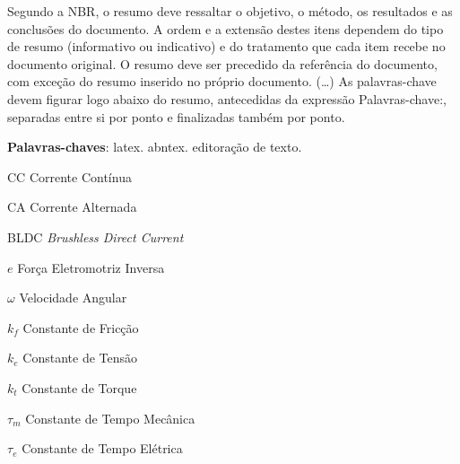 \documentclass[
	12pt,				%
	openright,			%
	oneside,			%
	a4paper,			%
	english,			%
	french,				%
	spanish,			%
	brazil,				%
	]{abntex2}
\begin{document}

\frenchspacing 


\imprimircapa

\imprimirfolhaderosto*



\setlength{\absparsep}{18pt} %
\begin{resumo}
 Segundo a NBR, o resumo deve ressaltar o
 objetivo, o método, os resultados e as conclusões do documento. A ordem e a extensão
 destes itens dependem do tipo de resumo (informativo ou indicativo) e do
 tratamento que cada item recebe no documento original. O resumo deve ser
 precedido da referência do documento, com exceção do resumo inserido no
 próprio documento. (\ldots) As palavras-chave devem figurar logo abaixo do
 resumo, antecedidas da expressão Palavras-chave:, separadas entre si por
 ponto e finalizadas também por ponto.

 \noindent
 \textbf{Palavras-chaves}: latex. abntex. editoração de texto.
\end{resumo}

\listoffigures*
\cleardoublepage

\listoftables*
\cleardoublepage

\begin{siglas}
  \item[CC] Corrente Contínua
  \item[CA] Corrente Alternada
	\item[BLDC] \textit{Brushless Direct Current}
\end{siglas}

\begin{simbolos}
  \item[$ e $] Força Eletromotriz Inversa
  \item[$ \omega $] Velocidade Angular
  \item[$ k_f $] Constante de Fricção
  \item[$ k_e $] Constante de Tensão
  \item[$ k_t $] Constante de Torque
	\item[$ \tau_m $] Constante de Tempo Mecânica
	\item[$ \tau_e $] Constante de Tempo Elétrica
\end{simbolos}
\end{document}
